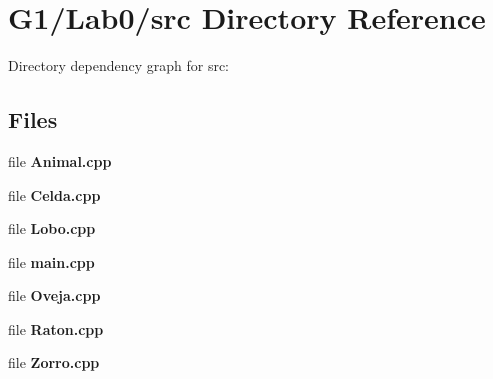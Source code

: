 \section{G1/\+Lab0/src Directory Reference}
\label{dir_948a6118d1e7f1148416eae1f769c645}
Directory dependency graph for src\+:
\subsection*{Files}
\begin{DoxyCompactItemize}
\item 
file {\bf Animal.\+cpp}
\item 
file {\bf Celda.\+cpp}
\item 
file {\bf Lobo.\+cpp}
\item 
file {\bf main.\+cpp}
\item 
file {\bf Oveja.\+cpp}
\item 
file {\bf Raton.\+cpp}
\item 
file {\bf Zorro.\+cpp}
\end{DoxyCompactItemize}
